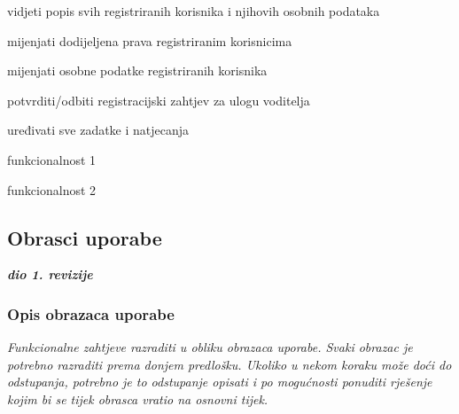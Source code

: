\begin{packed_enum}
\begin{packed_enum}
		\item vidjeti popis svih registriranih korisnika i njihovih osobnih podataka
		\item mijenjati dodijeljena prava registriranim korisnicima
		\item mijenjati osobne podatke registriranih korisnika
		\item potvrditi/odbiti registracijski zahtjev za ulogu voditelja
		\item uređivati sve zadatke i natjecanja
		
	\end{packed_enum}
	
	\item  {}
	
	\begin{packed_enum}
		
		\item funkcionalnost 1
		\item funkcionalnost 2
		
	\end{packed_enum}
\end{packed_enum}

\eject 
			
				
			\subsection{Obrasci uporabe}
				
				\textbf{\textit{dio 1. revizije}}
				
				\subsubsection{Opis obrazaca uporabe}
					\textit{Funkcionalne zahtjeve razraditi u obliku obrazaca uporabe. Svaki obrazac je potrebno razraditi prema donjem predlošku. Ukoliko u nekom koraku može doći do odstupanja, potrebno je to odstupanje opisati i po mogućnosti ponuditi rješenje kojim bi se tijek obrasca vratio na osnovni tijek.}\\
					

